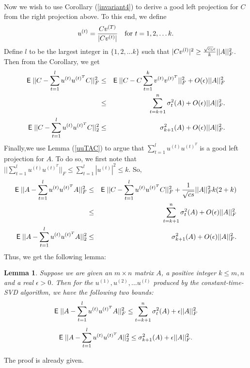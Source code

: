 \documentclass{book}
\newtheorem{lemma}[theorem]{Lemma}
\numberwithin{exercise}{chapter}
\begin{document}
Now we wish to use Corollary (\ref{invariant4}) to derive a good left projection for $C$ from the right
projection above. To this end, we define
$$u^{(t)}={Cv^{(T)}\over |Cv^{(t)}|}\quad\hbox{for } t=1,2,\ldots k.$$
Define $l$ to be the largest integer in $\{ 1,2,\ldots k\}$ such that
$|Cv^{(l)}|^2\geq {\sqrt{c_5}\epsilon\over k}||A||_F^2$. Then from the Corollary, we get
\begin{eqnarray}
\hbox{{\sf E}\;}||C-\sum_{t=1}^lu^{(t)}u^{(t)^T}C||_F^2&\leq&  \hbox{{\sf E}\;}||C-C\sum_{t=1}^kv^{(t)}v^{(t)^T}||_F^2+O(\epsilon)||A||_F^2
  \nonumber\\
&\leq&\sum_{t=k+1}^n \sigma_t^2(A)+O(\epsilon)||A||_F^2.\\
\hbox{{\sf E}\;}||C-\sum_{t=1}^lu^{(t)}u^{(t)^T}C||_2^2&\leq& \sigma_{k+1}^2(A)+O(\epsilon) ||A||_F^2\label{601}.
\end{eqnarray}
Finally,we use Lemma (\ref{uuTAC}) to argue that $\sum_{t=1}^lu^{(t)}u^{(t)^T}$ is a good left projection for $A$. To do so, we first note that
$||\sum_{t=1}^lu^{(t)}u^{(t)^T}||_F\leq\sum_{t=1}^l|u^{(t)}|^2\leq k$. So,
\begin{eqnarray*}
\hbox{{\sf E}\;}||A-\sum_{t=1}^lu^{(t)}u^{(t)^T}A||_F^2&\leq& \hbox{{\sf E}\;}||C-\sum_{t=1}^lu^{(t)}u^{(t)^T}C||_F^2+{1\over\sqrt{cs}}||A||_F^2k(2+k)\\
&\leq& \sum_{t=k+1}^n\sigma_t^2(A)+O(\epsilon)||A||_F^2\\
\hbox{{\sf E}\;}||A-\sum_{t=1}^lu^{(t)}u^{(t)^T}A||_2^2&\leq& \sigma_{k+1}^2(A)+O(\epsilon)||A||_F^2.
\end{eqnarray*}
Thus, we get the following lemma:
\begin{lemma}\label{conssvd}
Suppose we are given an $m\times n$ matrix $A$, a positive integer
$k\leq m,n$ and a real $\epsilon>0$. Then for the $u^{(1)},u^{(2)},\ldots u^{(l)}$
produced by the constant-time-SVD algorithm, we have the following two bounds:
$$\hbox{{\sf E}\;}||A-\sum_{t=1}^lu^{(t)}u^{(t)^T}A||_F^2\leq\sum_{t=k+1}^n\sigma_t^2(A)+\epsilon ||A||_F^2$$
$$\hbox{{\sf E}\;}||A-\sum_{t=1}^lu^{(t)}u^{(t)^T}A||_2^2\leq \sigma_{k+1}^2(A)+\epsilon ||A||_F^2.$$
\end{lemma}

The proof is already given.
\end{document}
